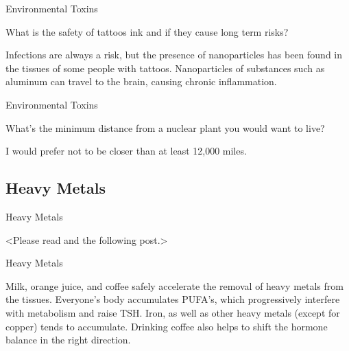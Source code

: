 \documentclass[11pt,oneside,openany,extrafontsizes]{memoir}
\begin{document}
\begin{qaexchange}{Environmental Toxins}

    \begin{question}
        What is the safety of tattoos ink and if they cause long term risks?
    \end{question}

    \begin{answer}
      Infections are always a risk, but the presence of nanoparticles has been found in the tissues of some people with tattoos. Nanoparticles of substances such as aluminum can travel to the brain, causing chronic inflammation.
    \end{answer}
\end{qaexchange}

\begin{qaexchange}{Environmental Toxins}

    \begin{question}
        What's the minimum distance from a nuclear plant you would want to live?
    \end{question}

    \begin{answer}
       I would prefer not to be closer than at least 12,000 miles.
    \end{answer}
\end{qaexchange}

\subsection{Heavy Metals}

\begin{standalonequote}{Heavy Metals}

    \begin{answer}
        <Please read  and the following post.>
    \end{answer}
\end{standalonequote}

\begin{standalonequote}{Heavy Metals}

    \begin{answer}
        Milk, orange juice, and coffee safely accelerate the removal of heavy metals from the tissues. Everyone's body accumulates PUFA's, which progressively interfere with metabolism and raise TSH. Iron, as well as other heavy metals (except for copper) tends to accumulate. Drinking coffee also helps to shift the hormone balance in the right direction.
    \end{answer}
\end{standalonequote}
\end{document}
